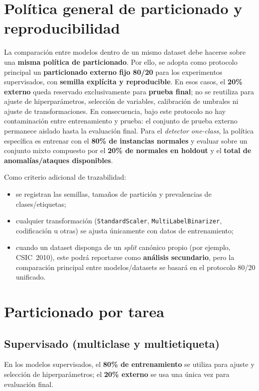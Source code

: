 \documentclass[12pt,oneside]{report}
\begin{document}
\section{Política general de particionado y reproducibilidad}
La comparación entre modelos dentro de un mismo dataset debe hacerse sobre una \textbf{misma política de particionado}. Por ello, se adopta como protocolo principal un \textbf{particionado externo fijo 80/20} para los experimentos supervisados, con \textbf{semilla explícita y reproducible}. En esos casos, el \textbf{20\% externo} queda reservado exclusivamente para \textbf{prueba final}; no se reutiliza para ajuste de hiperparámetros, selección de variables, calibración de umbrales ni ajuste de transformaciones. En consecuencia, bajo este protocolo no hay contaminación entre entrenamiento y prueba: el conjunto de prueba externo permanece aislado hasta la evaluación final. Para el \textit{detector one-class}, la política específica es entrenar con el \textbf{80\% de instancias normales} y evaluar sobre un conjunto mixto compuesto por el \textbf{20\% de normales en holdout} y el \textbf{total de anomalías/ataques disponibles}.

Como criterio adicional de trazabilidad:
\begin{itemize}[leftmargin=*]
  \item se registran las semillas, tamaños de partición y prevalencias de clases/etiquetas;
  \item cualquier transformación (\texttt{StandardScaler}, \texttt{MultiLabelBinarizer}, codificación u otras) se ajusta únicamente con datos de entrenamiento;
  \item cuando un dataset disponga de un \textit{split} canónico propio (por ejemplo, CSIC~2010), este podrá reportarse como \textbf{análisis secundario}, pero la comparación principal entre modelos/datasets se basará en el protocolo 80/20 unificado.
\end{itemize}

\section{Particionado por tarea}
\subsection{Supervisado (multiclase y multietiqueta)}
En los modelos supervisados, el \textbf{80\% de entrenamiento} se utiliza para ajuste y selección de hiperparámetros; el \textbf{20\% externo} se usa una única vez para evaluación final.
\end{document}
